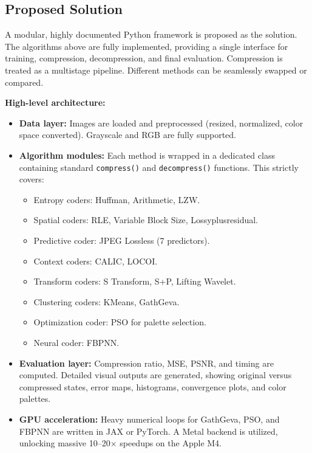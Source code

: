 \subsection{Proposed Solution}

A modular, highly documented Python framework is proposed as the solution. The algorithms above are fully implemented, providing a single interface for training, compression, decompression, and final evaluation. Compression is treated as a multistage pipeline. Different methods can be seamlessly swapped or compared.

\textbf{High-level architecture:}
\begin{itemize}
    \item \textbf{Data layer:} Images are loaded and preprocessed (resized, normalized, color space converted). Grayscale and RGB are fully supported.
    \item \textbf{Algorithm modules:} Each method is wrapped in a dedicated class containing standard \texttt{compress()} and \texttt{decompress()} functions. This strictly covers:
        \begin{itemize}
            \item Entropy coders: Huffman, Arithmetic, LZW.
            \item Spatial coders: RLE, Variable Block Size, Lossyplusresidual.
            \item Predictive coder: JPEG Lossless (7 predictors).
            \item Context coders: CALIC, LOCOI.
            \item Transform coders: S Transform, S+P, Lifting Wavelet.
            \item Clustering coders: KMeans, GathGeva.
            \item Optimization coder: PSO for palette selection.
            \item Neural coder: FBPNN.
        \end{itemize}
    \item \textbf{Evaluation layer:} Compression ratio, MSE, PSNR, and timing are computed. Detailed visual outputs are generated, showing original versus compressed states, error maps, histograms, convergence plots, and color palettes.
    \item \textbf{GPU acceleration:} Heavy numerical loops for GathGeva, PSO, and FBPNN are written in JAX or PyTorch. A Metal backend is utilized, unlocking massive 10–20× speedups on the Apple M4.
\end{itemize}

